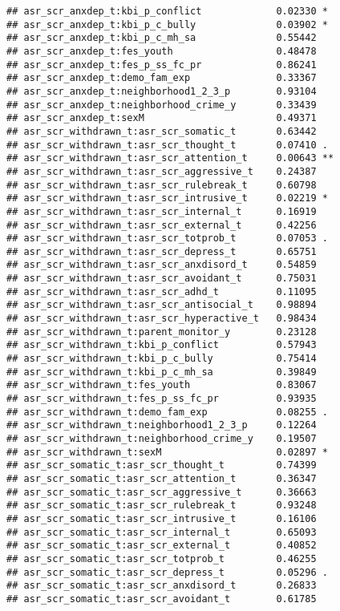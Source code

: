 \documentclass[
]{article}
\begin{document}
\begin{verbatim}
## asr_scr_anxdep_t:kbi_p_conflict             0.02330 *  
## asr_scr_anxdep_t:kbi_p_c_bully              0.03902 *  
## asr_scr_anxdep_t:kbi_p_c_mh_sa              0.55442    
## asr_scr_anxdep_t:fes_youth                  0.48478    
## asr_scr_anxdep_t:fes_p_ss_fc_pr             0.86241    
## asr_scr_anxdep_t:demo_fam_exp               0.33367    
## asr_scr_anxdep_t:neighborhood1_2_3_p        0.93104    
## asr_scr_anxdep_t:neighborhood_crime_y       0.33439    
## asr_scr_anxdep_t:sexM                       0.49371    
## asr_scr_withdrawn_t:asr_scr_somatic_t       0.63442    
## asr_scr_withdrawn_t:asr_scr_thought_t       0.07410 .  
## asr_scr_withdrawn_t:asr_scr_attention_t     0.00643 ** 
## asr_scr_withdrawn_t:asr_scr_aggressive_t    0.24387    
## asr_scr_withdrawn_t:asr_scr_rulebreak_t     0.60798    
## asr_scr_withdrawn_t:asr_scr_intrusive_t     0.02219 *  
## asr_scr_withdrawn_t:asr_scr_internal_t      0.16919    
## asr_scr_withdrawn_t:asr_scr_external_t      0.42256    
## asr_scr_withdrawn_t:asr_scr_totprob_t       0.07053 .  
## asr_scr_withdrawn_t:asr_scr_depress_t       0.65751    
## asr_scr_withdrawn_t:asr_scr_anxdisord_t     0.54859    
## asr_scr_withdrawn_t:asr_scr_avoidant_t      0.75031    
## asr_scr_withdrawn_t:asr_scr_adhd_t          0.11095    
## asr_scr_withdrawn_t:asr_scr_antisocial_t    0.98894    
## asr_scr_withdrawn_t:asr_scr_hyperactive_t   0.98434    
## asr_scr_withdrawn_t:parent_monitor_y        0.23128    
## asr_scr_withdrawn_t:kbi_p_conflict          0.57943    
## asr_scr_withdrawn_t:kbi_p_c_bully           0.75414    
## asr_scr_withdrawn_t:kbi_p_c_mh_sa           0.39849    
## asr_scr_withdrawn_t:fes_youth               0.83067    
## asr_scr_withdrawn_t:fes_p_ss_fc_pr          0.93935    
## asr_scr_withdrawn_t:demo_fam_exp            0.08255 .  
## asr_scr_withdrawn_t:neighborhood1_2_3_p     0.12264    
## asr_scr_withdrawn_t:neighborhood_crime_y    0.19507    
## asr_scr_withdrawn_t:sexM                    0.02897 *  
## asr_scr_somatic_t:asr_scr_thought_t         0.74399    
## asr_scr_somatic_t:asr_scr_attention_t       0.36347    
## asr_scr_somatic_t:asr_scr_aggressive_t      0.36663    
## asr_scr_somatic_t:asr_scr_rulebreak_t       0.93248    
## asr_scr_somatic_t:asr_scr_intrusive_t       0.16106    
## asr_scr_somatic_t:asr_scr_internal_t        0.65093    
## asr_scr_somatic_t:asr_scr_external_t        0.40852    
## asr_scr_somatic_t:asr_scr_totprob_t         0.46255    
## asr_scr_somatic_t:asr_scr_depress_t         0.05296 .  
## asr_scr_somatic_t:asr_scr_anxdisord_t       0.26833    
## asr_scr_somatic_t:asr_scr_avoidant_t        0.61785    

\end{verbatim}
\end{document}
